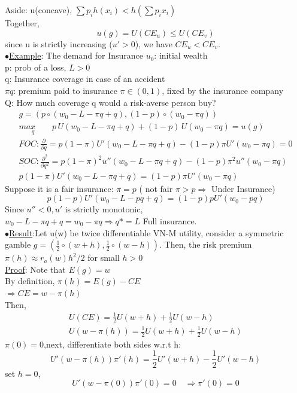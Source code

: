 \documentclass[letterpaper,13pt,single,pdftex]{scrartcl}
\begin{document}
Aside: u(concave), $\sum p_i h(x_i) < h(\sum p_ix_i)$\\
Together, 
\[u(g) = U(CE_u) \le U(CE_v)\]
since u is strictly increasing ($u'>0$), we have $CE_u< CE_v$.\\
$\bullet$\underline{Example}: The demand for Insurance
$u_0$: initial wealth\\
p: prob of a loss, $L>0$\\
q: Insurance coverage in case of an accident\\
$\pi q$: premium paid to insurance   $\pi \in (0,1)$, fixed by the insurance company \\
Q: How much coverage q would a risk-averse person buy?
\begin{gather*}
    g = (p \circ (w_0 -L-\pi q+q), (1-p)\circ (w_0 - \pi q))\\
    max\limits_q \qquad p \, U(w_0 -L-\pi q+q) + (1-p)\, U(w_0 - \pi q) = u(g)\\
    FOC: \frac{\partial}{\partial q} = p(1-\pi) U'(w_0 -L-\pi q+q) -(1-p)\pi U'(w_0 - \pi q) = 0\\
    SOC: \frac{\partial^2}{\partial q^2} = p(1-\pi)^2 u''(w_0 -L-\pi q+q) -(1-p)\pi^2u''(w_0 - \pi q)\\
    p(1-\pi) U'(w_0 -L-\pi q+q) = (1-p)\pi U'(w_0 - \pi q)
\end{gather*}
Suppose it is a fair insurance: $\pi = p$ ( not fair $\pi > p \Rightarrow$ Under Insurance)
\[p(1-p) U'(w_0 -L-p q+q) = (1-p)p U'(w_0 - p q)\]
Since $u''<0, u'$ is strictly monotonic,\\
$ w_0 -L-\pi q+q = w_0 - \pi q \Rightarrow q* = L$    Full insurance.\\

$\bullet$\underline{Result}:Let u(w) be twice differentiable VN-M utility, consider a symmetric gamble $g= (\frac{1}{2}\circ (w+h), \frac{1}{2}\circ (w-h))$. Then, the risk premium $\pi(h) \approx r_a(w)h^2/2 $  for small $h>0$\\
\underline{Proof}:
Note that $E(g) = w$\\
By definition, $\pi(h) = E(g) - CE$\\
$\Rightarrow CE = w - \pi(h)$\\
Then, 
\begin{gather*}
    U(CE) = \frac{1}{2}U(w+h) +\frac{1}{2} U(w-h)\\
    U(w - \pi(h)) = \frac{1}{2}U(w+h) + \frac{1}{2}U(w-h)
\end{gather*}
$\pi(0) = 0$,next, differentiate both sides w.r.t h:
\[U'(w-\pi(h)) \pi'(h) = \frac{1}{2}U'(w+h) -\frac{1}{2} U'(w-h)\]
set $h = 0$, 
\[U'(w-\pi(0)) \pi'(0) = 0\quad\Rightarrow \pi'(0) = 0\]
\end{document}
